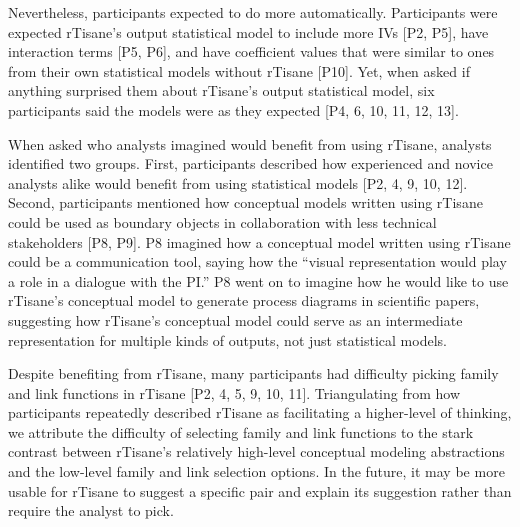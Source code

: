Nevertheless, participants expected \rTisane to do more automatically.
Participants were expected rTisane’s output statistical model to include more
IVs [P2, P5], have interaction terms [P5, P6], and have coefficient values that
were similar to ones from their own statistical models without rTisane [P10].
Yet, when asked if anything surprised them about rTisane’s output statistical
model, six participants said the models were as they expected [P4, 6, 10, 11,
12, 13]. 


\theme{}
When asked who analysts imagined would benefit from using rTisane, analysts
identified two groups. First, participants described how experienced and novice
analysts alike would benefit from using statistical models [P2, 4, 9, 10, 12].
Second, participants mentioned how conceptual models written using rTisane could
be used as boundary objects in collaboration with less technical stakeholders
[P8, P9]. P8 imagined how a conceptual model written using rTisane could be a
communication tool, saying how the “visual representation would play a role in a
dialogue with the PI.” P8 went on to imagine how he would like to use rTisane’s
conceptual model to generate process diagrams in scientific papers, suggesting
how rTisane’s conceptual model could serve as an intermediate representation for
multiple kinds of outputs, not just statistical models. 

Despite benefiting from rTisane, many participants had difficulty picking family
and link functions in rTisane [P2, 4, 5, 9, 10, 11]. Triangulating from how
participants repeatedly described rTisane as facilitating a higher-level of
thinking, we attribute the difficulty of selecting family and link functions to
the stark contrast between rTisane’s relatively high-level conceptual modeling
abstractions and the low-level family and link selection options. In the future,
it may be more usable for rTisane to suggest a specific pair and explain its
suggestion rather than require the analyst to pick.

